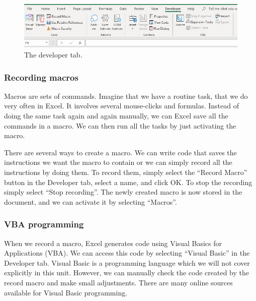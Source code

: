 \documentclass[]{book}
\begin{document}
\begin{figure}

{\centering \includegraphics[width=0.8\linewidth]{_resources/chapter_advexc/13} 

}

\caption{The developer tab.}\label{fig:advex8}
\end{figure}

\hypertarget{recording-macros}{%
\subsubsection*{Recording macros}\label{recording-macros}}

Macros are sets of commands. Imagine that we have a routine task, that we do very often in Excel. It involves several mouse-clicks and formulas. Instead of doing the same task again and again manually, we can Excel save all the commands in a macro. We can then run all the tasks by just activating the macro.

There are several ways to create a macro. We can write code that saves the instructions we want the macro to contain or we can simply record all the instructions by doing them. To record them, simply select the ``Record Macro'' button in the Developer tab, select a name, and click OK. To stop the recording simply select ``Stop recording''. The newly created macro is now stored in the document, and we can activate it by selecting ``Macros''.

\hypertarget{vba-programming}{%
\subsubsection*{VBA programming}\label{vba-programming}}

When we record a macro, Excel generates code using Visual Basics for Applications (VBA). We can access this code by selecting ``Visual Basic'' in the Developer tab. Visual Basic is a programming language which we will not cover explicitly in this unit. However, we can manually check the code created by the record macro and make small adjustments. There are many online sources available for Visual Basic programming.
\end{document}
